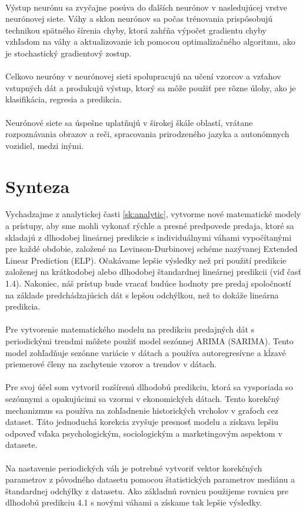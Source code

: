     \\
    Výstup neurónu sa zvyčajne posúva do ďalších neurónov v nasledujúcej vrstve neurónovej siete. Váhy a sklon neurónov sa počas trénovania
    prispôsobujú technikou spätného šírenia chyby, ktorá zahŕňa výpočet gradientu chyby vzhľadom na váhy a aktualizovanie ich pomocou
    optimalizačného algoritmu, ako je stochastický gradientový zostup.\\
    \\
    Celkovo neuróny v neurónovej sieti spolupracujú na učení vzorcov a vzťahov vstupných dát a produkujú výstup, ktorý sa môže použiť pre rôzne
    úlohy, ako je klasifikácia, regresia a predikcia.\\
    \\
    Neurónové siete sa úspešne uplatňujú v širokej škále oblastí, vrátane rozpoznávania obrazov a reči, spracovania prirodzeného
    jazyka a autonómnych vozidiel, medzi inými.
    \section{Synteza}
    Vychadzajme z analytickej časti \ref{sk:analytic}, vytvorme nové matematické modely a prístupy, aby sme mohli vykonať rýchle a presné predpovede predaja,
    ktoré sa skladajú z dlhodobej lineárnej predikcie s individuálnymi váhami vypočítanými pre každé obdobie, založené na Levinson-Durbinovej schéme
    nazývanej Extended Linear Prediction (ELP). Očakávame lepšie výsledky než pri použití predikcie založenej na krátkodobej alebo
    dlhodobej štandardnej lineárnej predikcii (viď časť 1.4). Nakoniec, náš prístup bude vracať budúce hodnoty pre predaj spoločností na základe
    predchádzajúcich dát s lepšou odchýlkou, než to dokáže lineárna predikcia.\\
    \\
    Pre vytvorenie matematického modelu na predikciu predajných dát s periodickými trendmi môžete použiť model sezónnej ARIMA (SARIMA).
    Tento model zohľadňuje sezónne variácie v dátach a používa autoregresívne a kĺzavé priemerové členy na zachytenie vzorov a trendov v dátach.\\
    \\
    Pre svoj účel som vytvoril rozšírenú dlhodobú predikciu, ktorá sa vysporiada so sezónnymi a opakujúcimi sa vzormi v ekonomických dátach.
    Tento korekčný mechanizmus sa používa na zohľadnenie historických vrcholov v grafoch cez dataset. Táto jednoduchá korekcia zvyšuje
    presnosť modelu a získava lepšiu odpoveď vďaka psychologickým, sociologickým a marketingovým aspektom v datasete.\\
    \\
    Na nastavenie periodických váh je potrebné vytvoriť vektor korekčných parametrov z pôvodného datasetu pomocou štatistických parametrov
    mediánu a štandardnej odchýlky z datasetu. Ako základnú rovnicu použijeme rovnicu pre dlhodobú predikciu 4.1 s novými váhami a získame tak lepšie výsledky.
